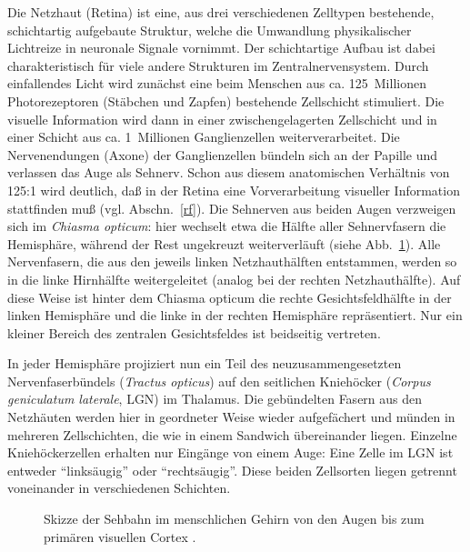 Die Netzhaut (Retina) ist eine, aus drei verschiedenen Zelltypen
bestehende, schichtartig aufgebaute Struktur, welche die Umwandlung
physikalischer Lichtreize in neuronale Signale vornimmt. Der schichtartige
Aufbau ist dabei charakteristisch für viele andere Strukturen im
Zentralnervensystem. Durch einfallendes Licht wird zunächst eine beim
Menschen aus ca. 125~Millionen Photorezeptoren (Stäbchen und Zapfen)
bestehende Zellschicht stimuliert. Die visuelle Information wird dann in
einer zwischengelagerten Zellschicht und in einer Schicht aus
ca. 1~Millionen Ganglienzellen weiterverarbeitet. Die Nervenendungen
(Axone) der Ganglienzellen bündeln sich an der Papille und verlassen das
Auge als Sehnerv. Schon aus diesem anatomischen Verhältnis von 125:1 wird
deutlich, daß in der Retina eine Vorverarbeitung visueller Information
stattfinden muß (vgl. Abschn.~\ref{rf}). Die Sehnerven aus beiden Augen
verzweigen sich im \emph{Chiasma opticum}: hier wechselt etwa die Hälfte
aller Sehnervfasern die Hemisphäre, während der Rest ungekreuzt
weiterverläuft (siehe Abb.~\ref{sehbahn}). Alle Nervenfasern, die aus den
jeweils linken Netzhauthälften entstammen, werden so in die linke
Hirnhälfte weitergeleitet (analog bei der rechten Netzhauthälfte). Auf
diese Weise ist hinter dem Chiasma opticum die rechte Gesichtsfeldhälfte
in der linken Hemisphäre und die linke in der rechten Hemisphäre
repräsentiert. Nur ein kleiner Bereich des zentralen Gesichtsfeldes ist
beidseitig vertreten.

In jeder Hemisphäre projiziert nun ein Teil des neuzusammengesetzten
Nervenfaserbündels (\emph{Tractus opticus}) auf den seitlichen Kniehöcker
(\emph{Corpus geniculatum laterale}, LGN) im Thalamus. Die gebündelten
Fasern aus den Netzhäuten werden hier in geordneter Weise wieder
aufgefächert und münden in mehreren Zellschichten, die wie in einem
Sandwich übereinander liegen. Einzelne Kniehöckerzellen erhalten nur
Eingänge von einem Auge: Eine Zelle im LGN ist entweder ``linksäugig''
oder ``rechtsäugig''. Diese beiden Zellsorten liegen getrennt voneinander
in verschiedenen Schichten.

\begin{figure}[t]
    \centering
    \caption{Skizze der Sehbahn im menschlichen Gehirn von den Augen bis zum
    primären visuellen Cortex \parencite[aus][]{churchland:1992}.}
    \label{sehbahn}
\end{figure}

